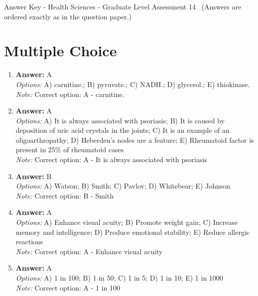\documentclass[12pt]{article}
\begin{document}
\begin{center}
Answer Key - Health Sciences - Graduate Level Assessment 14 \
\small (Answers are ordered exactly as in the question paper.)
\end{center}

\section*{Multiple Choice}
\begin{enumerate}[label=\arabic*.]
\item \textbf{Answer:} A
\\ \textit{Options:} A) carnitine.; B) pyruvate.; C) NADH.; D) glycerol.; E) thiokinase.
\\ \textit{Note:} Correct option: A - carnitine.
\item \textbf{Answer:} A
\\ \textit{Options:} A) It is always associated with psoriasis; B) It is caused by deposition of uric acid crystals in the joints; C) It is an example of an oligoarthropathy; D) Heberden's nodes are a feature; E) Rheumatoid factor is present in 25\% of rheumatoid cases
\\ \textit{Note:} Correct option: A - It is always associated with psoriasis
\item \textbf{Answer:} B
\\ \textit{Options:} A) Watson; B) Smith; C) Pavlov; D) Whitebear; E) Johnson
\\ \textit{Note:} Correct option: B - Smith
\item \textbf{Answer:} A
\\ \textit{Options:} A) Enhance visual acuity; B) Promote weight gain; C) Increase memory and intelligence; D) Produce emotional stability; E) Reduce allergic reactions
\\ \textit{Note:} Correct option: A - Enhance visual acuity
\item \textbf{Answer:} A
\\ \textit{Options:} A) 1 in 100; B) 1 in 50; C) 1 in 5; D) 1 in 10; E) 1 in 1000
\\ \textit{Note:} Correct option: A - 1 in 100
\end{enumerate}
\end{document}
